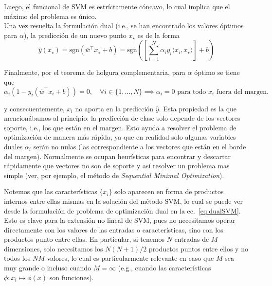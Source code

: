 Luego, el funcional de SVM es estríctamente cóncavo, lo cual implica que el máximo del problema es único.\\

 Una vez resuelta la formulación dual (i.e., se han encontrado los valores óptimos para $\alpha$), la predicción de un nuevo punto $x_\star$ es de la forma 
\begin{equation}
    \hat{y}(x_\star)= \text{sgn} (\overline{w}^\top x_\star + b) = \text{sgn}\left(\left[\sum\limits_{i=1}^{N} \alpha_i y_i \langle x_i, x_\star\rangle\right] + b\right)
 \end{equation}
 
Finalmente, por el teorema de holgura complementaria, para $\alpha$ óptimo se tiene que
\begin{equation}
    \alpha_i \left(1-y_i (\overline{w}^\top x_i +b)\right) = 0,\quad \forall i\in\{1,\ldots,N\}\implies \alpha_i=0\text{ para todo $x_i$ fuera del margen.}
\end{equation}

y consecuentemente, $x_i$ no aporta en la predicción $\hat{y}$. Esta propiedad es la que mencionábamos al principio: la predicción de clase solo depende de los vectores soporte, i.e., los que están en el margen. Esto ayuda a resolver el problema de optimización de manera más rápida, ya que en realidad solo algunas variables duales $\alpha_i$ serán no nulas (las correspondiente a los vectores que están en el borde del margen). Normalmente se ocupan heurísticas para encontrar y descartar rápidamente que vectores no son de soporte y así resolver un problema mas simple (ver, por ejemplo, el método de \emph{Sequential Minimal Optimization}). 


\begin{remark} Notemos que las características $\{x_i\}$ solo aparecen en forma de productos internos entre ellas mismas en la solución del método SVM, lo cual se puede ver desde la formulación de problema de optimización dual en la ec.~\eqref{eq:dualSVM}. Esto es clave para la extensión no lineal de SVM, pues no necesitamos operar directamente  con los valores de las entradas o características, sino con los productos punto entre ellas. En particular, si tenemos $N$ entradas de $M$ dimensiones, solo necesitamos los $N(N+1)/2$ productos puntos entre ellos y no todos los $NM$ valores, lo cual es particularmente relevante en caso que $M$ sea muy grande o incluso cuando $M=\infty$ (e.g., cuando las características $\phi:x_i\mapsto \phi(x)$ son funciones).
\end{remark} 

